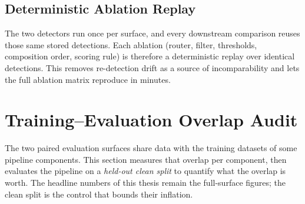 \subsection{Deterministic Ablation Replay}
\label{sec:unified_cache}

The two detectors run once per surface, and every downstream comparison reuses those same stored detections. Each ablation (router, filter, thresholds, composition order, scoring rule) is therefore a deterministic replay over identical detections. This removes re-detection drift as a source of incomparability and lets the full ablation matrix reproduce in minutes.

\section{Training--Evaluation Overlap Audit}
\label{sec:svanstrom_audit}

The two paired evaluation surfaces share data with the training datasets of some pipeline components. This section measures that overlap per component, then evaluates the pipeline on a \emph{held-out clean split} to quantify what the overlap is worth. The headline numbers of this thesis remain the full-surface figures; the clean split is the control that bounds their inflation.

